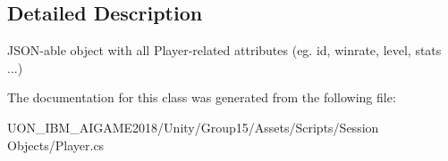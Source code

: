 \subsection{Detailed Description}
J\+S\+O\+N-\/able object with all Player-\/related attributes (eg. id, winrate, level, stats ...) 

The documentation for this class was generated from the following file\+:\begin{DoxyCompactItemize}
\item 
U\+O\+N\+\_\+\+I\+B\+M\+\_\+\+A\+I\+G\+A\+M\+E2018/\+Unity/\+Group15/\+Assets/\+Scripts/\+Session Objects/Player.\+cs\end{DoxyCompactItemize}
